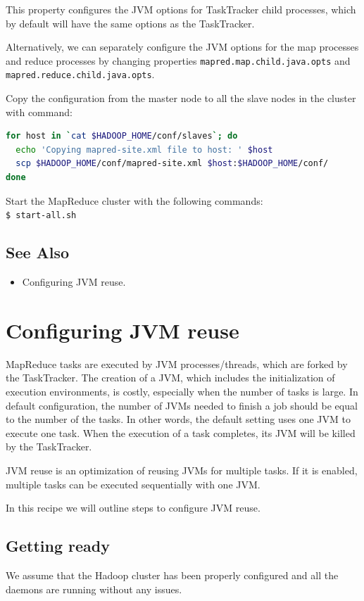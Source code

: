 This property configures the JVM options for TaskTracker child processes, which by default will have the same options as the TaskTracker.

Alternatively, we can separately configure the JVM options for the map processes and reduce processes by changing properties \verb|mapred.map.child.java.opts| and \verb|mapred.reduce.child.java.opts|.

Copy the configuration from the master node to all the slave nodes in the cluster with command:
\lstset{style=bashstyle}
\begin{lstlisting}[language=bash]
for host in `cat $HADOOP_HOME/conf/slaves`; do
  echo 'Copying mapred-site.xml file to host: ' $host
  scp $HADOOP_HOME/conf/mapred-site.xml $host:$HADOOP_HOME/conf/
done
\end{lstlisting}

Start the MapReduce cluster with the following commands: \\
\verb|$ start-all.sh|

\subsection*{See Also}
\begin{itemize}
  \item Configuring JVM reuse.
\end{itemize}
\section{Configuring JVM reuse}
MapReduce tasks are executed by JVM processes/threads, which are forked by the TaskTracker. The creation of a JVM, which includes the initialization of execution environments, is costly, especially when the number of tasks is large. In default configuration, the number of JVMs needed to finish a job should be equal to the number of the tasks. In other words, the default setting uses one JVM to execute one task. When the execution of a task completes, its JVM will be killed by the TaskTracker.

JVM reuse is an optimization of reusing JVMs for multiple tasks. If it is enabled, multiple tasks can be executed sequentially with one JVM.

In this recipe we will outline steps to configure JVM reuse.
\subsection*{Getting ready}
We assume that the Hadoop cluster has been properly configured and all the daemons are running without any issues.


